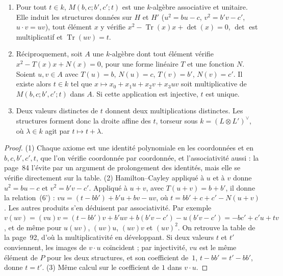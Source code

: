 \begin{enonce}\leavevmode
\begin{enumerate}
\item Pour tout $t \in k$, $M(b, c; b', c'; t)$ est une $k$-algèbre associative et unitaire. Elle induit les structures données sur $H$ et $H'$ ($u^2 = bu - c$, $v^2 = b'v - c'$, $u \cdot v = uv$), tout élément $x$ y vérifie $x^2 - \operatorname{Tr}(x)x + \det(x) = 0$, $\det$ est multiplicatif et $\operatorname{Tr}(uv) = t$.
\item Réciproquement, soit $A$ une $k$-algèbre dont tout élément vérifie $x^2 - T(x)x + N(x) = 0$, pour une forme linéaire $T$ et une fonction $N$. Soient $u, v \in A$ avec $T(u) = b$, $N(u) = c$, $T(v) = b'$, $N(v) = c'$. Il existe alors $t \in k$ tel que $x \mapsto x_0 + x_1u + x_2v + x_3uv$ soit multiplicative de $M(b, c; b', c'; t)$ dans $A$. Si cette application est injective, $t$ est unique.
\item Deux valeurs distinctes de $t$ donnent deux multiplications distinctes. Les structures forment donc la droite affine des $t$, torseur sous $k = (L \otimes L')^{\vee}$, où $\lambda \in k$ agit par $t \mapsto t + \lambda$.
\end{enumerate}
\end{enonce}

\begin{proof}
(1) Chaque axiome est une identité polynomiale en les coordonnées et en $b, c, b', c', t$, que l'on vérifie coordonnée par coordonnée, et l'associativité aussi : la page~84 l'évite par un argument de prolongement des identités, mais elle se vérifie directement sur la table. (2) Hamilton--Cayley appliqué à $u$ et à $v$ donne $u^2 = bu - c$ et $v^2 = b'v - c'$. Appliqué à $u + v$, avec $T(u + v) = b + b'$, il donne la relation~(6') : $vu = (t - bb') + b'u + bv - uv$, où $t = bb' + c + c' - N(u + v)$. Les autres produits s'en déduisent par associativité. Par exemple $v(uv) = (vu)v = (t - bb')v + b'uv + b(b'v - c') - u(b'v - c') = -bc' + c'u + tv$, et de même pour $u(uv)$, $(uv)u$, $(uv)v$ et $(uv)^2$. On retrouve la table de la page~92, d'où la multiplicativité en développant. Si deux valeurs $t$ et $t'$ conviennent, les images de $v \cdot u$ coïncident ; par injectivité, $vu$ est le même élément de $P$ pour les deux structures, et son coefficient de~$1$, $t - bb' = t' - bb'$, donne $t = t'$. (3) Même calcul sur le coefficient de $1$ dans $v \cdot u$.
\end{proof}

